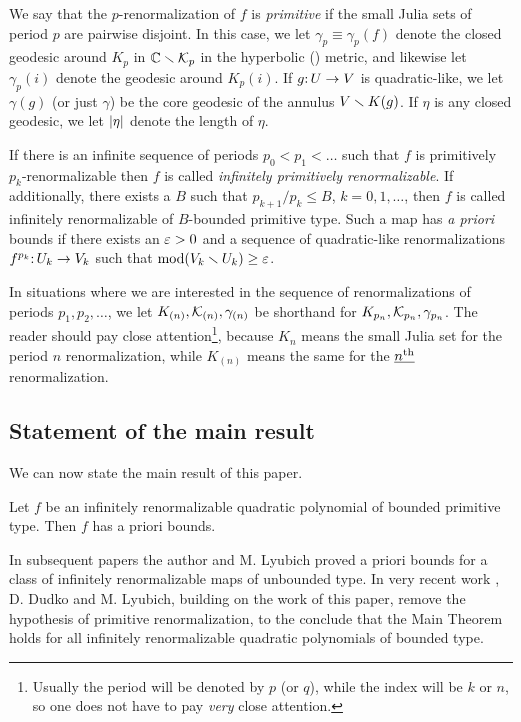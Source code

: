 We say that the $p$-renormalization of $f$ is \emph{primitive} if the small Julia sets of period $p$ are pairwise disjoint.
In this case,
we let $\gamma_p \equiv \gamma_p(f)$ denote the closed geodesic around $K_p$ in ${\Bbb C} \smallsetminus {\mathcal K}_p$ in the hyperbolic (\poincare) metric,
and likewise let $\gamma_p(i)$ denote the geodesic around $K_p(i)$. 
If $g\mathpunct: U\to V$ is quadratic-like,
we let $\gamma(g)$ (or just $\gamma$) be the core geodesic of the annulus $V \smallsetminus K(g)$. 
If $\eta$ is any closed geodesic,
we let $\left\vert \eta \right\vert$ denote the length of $\eta$.

If there is an infinite
sequence of periods $p_0< p_1<\dots$ such that $f$ is primitively
$p_k$-renormalizable then  $f$ is called {\it infinitely primitively renormalizable}.
If additionally, there exists a $B$ such that $p_{k+1} / p_k\leq B$, $k=0,1,\dots$,
then  $f$ is called infinitely renormalizable of $B$-bounded primitive type.
Such a map has \emph{a priori} bounds if there exists an ${\varepsilon}>0$ and
a sequence of quadratic-like renormalizations $f^{p_k}\mathpunct: U_k\to V_k$ such that
$\operatorname{mod}(V_k\smallsetminus U_k)\geq {\varepsilon}$.

In situations where we are interested in the sequence of renormalizations of periods $p_1, p_2, \ldots$,
we let $K_{(n)}, {\mathcal K}_{(n)}, \gamma_{(n)}$ be shorthand for $K_{p_n}, {\mathcal K}_{p_n}, \gamma_{p_n}$.
The reader should pay close attention\footnote{Usually the period will be denoted by $p$ (or $q$), while the index will be $k$ or $n$, so one does not have to pay \emph{very} close attention.},
because $K_{n}$ means the small Julia set for the period $n$ renormalization,
while $K_{(n)}$ means the same for the $\underline{n^{\text{th}}}$ renormalization.


\subsection{Statement of the main result} \label{intro:main}
We can now state the main result of this paper.
\begin{mainthm}
Let $f$ be an infinitely renormalizable
quadratic polynomial of bounded primitive type. Then $f$ has a priori bounds.
\end{mainthm}

In subsequent papers \cite{decorations, molecules}
the author and M. Lyubich proved a priori bounds for 
a  class of infinitely renormalizable maps of unbounded type.
In very recent work \cite{satellite}, D. Dudko and M. Lyubich,
building on the work of this paper,
remove the hypothesis of primitive renormalization, 
to the conclude that the Main Theorem holds for all infinitely renormalizable quadratic polynomials of bounded type.


